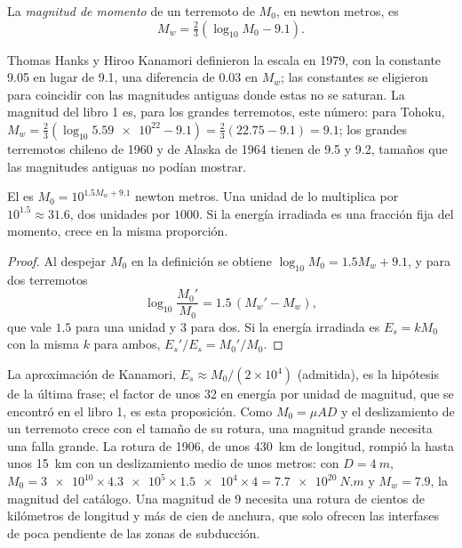 \begin{definition}\label{def:b1:earthquake-source:mw}
La \emph{magnitud de momento} de un terremoto de  $M_0$, en newton metros, es
\[
  M_w = \tfrac23\left(\log_{10} M_0 - 9.1\right) .
\]
\end{definition}

Thomas Hanks y Hiroo Kanamori definieron la escala en 1979, con la constante 9.05 en lugar de 9.1, una diferencia de 0.03 en $M_w$; las
constantes se eligieron para coincidir con las magnitudes antiguas donde estas no se saturan. La magnitud del libro 1 es, para los
grandes terremotos, este número: para Tohoku,
$M_w = \tfrac23(\log_{10}\num{5.59e22} - 9.1) = \tfrac23(22.75 - 9.1) = 9.1$;
los grandes terremotos chileno de 1960 y de Alaska de 1964 tienen  de 9.5 y 9.2, tamaños que las magnitudes
antiguas no podían mostrar.

\begin{proposition}\label{prop:b1:earthquake-source:moment-steps}
El  es $M_0 = 10^{1.5 M_w + 9.1}$ newton metros. Una unidad de  lo multiplica por $10^{1.5} \approx 31.6$,
dos unidades por $1000$. Si la energía irradiada es una fracción fija del momento, crece en la misma proporción.
\end{proposition}

\begin{proof}
Al despejar $M_0$ en la definición se obtiene $\log_{10} M_0 = 1.5 M_w + 9.1$,
y para dos terremotos
\[
  \log_{10}\frac{M_0'}{M_0} = 1.5\,(M_w' - M_w) ,
\]
que vale $1.5$ para una unidad y $3$ para dos. Si la energía irradiada es $E_s = k M_0$ con la misma $k$
para ambos, $E_s'/E_s = M_0'/M_0$.
\end{proof}

La aproximación de Kanamori, $E_s \approx M_0/(2\times10^4)$ (admitida), es la hipótesis de la última frase; el factor de unos 32 en
energía por unidad de magnitud, que se encontró en el libro 1, es esta proposición. Como $M_0 = \mu A D$ y el deslizamiento de un
terremoto crece con el tamaño de su rotura, una magnitud grande necesita una falla grande. La rotura de 1906, de unos \qty{430}{km} de
longitud, rompió la  hasta unos \qty{15}{km} con un deslizamiento medio de unos metros: con $D = \qty{4}{m}$,
$M_0 = \num{3e10}\times\num{4.3e5}\times\num{1.5e4}
\times 4 = \qty{7.7e20}{N.m}$ y $M_w = 7.9$, la magnitud del catálogo. Una magnitud de 9 necesita una rotura de cientos de kilómetros de
longitud y más de cien de anchura, que solo ofrecen las interfases de poca pendiente de las zonas de subducción.

